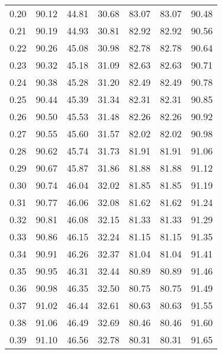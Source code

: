 \begin{tabular}{|c|c|c|c|c|c|c|}
      0.20 &     90.12 &     44.81 &      30.68 &   83.07 &      83.07 &         90.48 \\
      0.21 &     90.19 &     44.93 &      30.81 &   82.92 &      82.92 &         90.56 \\
      0.22 &     90.26 &     45.08 &      30.98 &   82.78 &      82.78 &         90.64 \\
      0.23 &     90.32 &     45.18 &      31.09 &   82.63 &      82.63 &         90.71 \\
      0.24 &     90.38 &     45.28 &      31.20 &   82.49 &      82.49 &         90.78 \\
      0.25 &     90.44 &     45.39 &      31.34 &   82.31 &      82.31 &         90.85 \\
      0.26 &     90.50 &     45.53 &      31.48 &   82.26 &      82.26 &         90.92 \\
      0.27 &     90.55 &     45.60 &      31.57 &   82.02 &      82.02 &         90.98 \\
      0.28 &     90.62 &     45.74 &      31.73 &   81.91 &      81.91 &         91.06 \\
      0.29 &     90.67 &     45.87 &      31.86 &   81.88 &      81.88 &         91.12 \\
      0.30 &     90.74 &     46.04 &      32.02 &   81.85 &      81.85 &         91.19 \\
      0.31 &     90.77 &     46.06 &      32.08 &   81.62 &      81.62 &         91.24 \\
      0.32 &     90.81 &     46.08 &      32.15 &   81.33 &      81.33 &         91.29 \\
      0.33 &     90.86 &     46.15 &      32.24 &   81.15 &      81.15 &         91.35 \\
      0.34 &     90.91 &     46.26 &      32.37 &   81.04 &      81.04 &         91.41 \\
      0.35 &     90.95 &     46.31 &      32.44 &   80.89 &      80.89 &         91.46 \\
      0.36 &     90.98 &     46.35 &      32.50 &   80.75 &      80.75 &         91.49 \\
      0.37 &     91.02 &     46.44 &      32.61 &   80.63 &      80.63 &         91.55 \\
      0.38 &     91.06 &     46.49 &      32.69 &   80.46 &      80.46 &         91.60 \\
      0.39 &     91.10 &     46.56 &      32.78 &   80.31 &      80.31 &         91.65 \\

\end{tabular}
